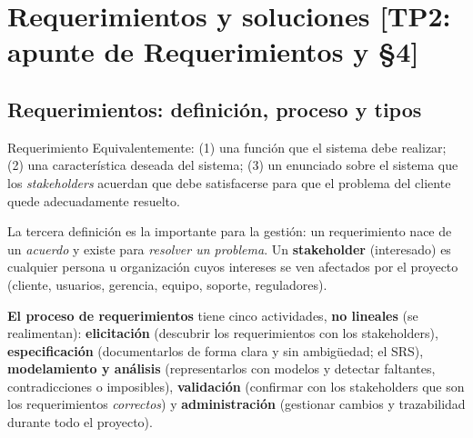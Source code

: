 \documentclass[11pt,a4paper]{article}
\begin{document}
\section[Requerimientos y soluciones]{Requerimientos y soluciones \hfill {\normalsize [TP2: apunte de Requerimientos y §4]}}
\label{sec:req}
\subsection{Requerimientos: definición, proceso y tipos}
\begin{defbox}{Requerimiento}
Equivalentemente: (1) una función que el sistema debe realizar; (2) una característica deseada del sistema;
(3) un enunciado sobre el sistema que los \emph{stakeholders} acuerdan que debe satisfacerse para que el
problema del cliente quede adecuadamente resuelto.
\end{defbox}
La tercera definición es la importante para la gestión: un requerimiento nace de un \emph{acuerdo} y existe
para \emph{resolver un problema}. Un \textbf{stakeholder} (interesado) es cualquier persona u organización cuyos
intereses se ven afectados por el proyecto (cliente, usuarios, gerencia, equipo, soporte, reguladores).

\textbf{El proceso de requerimientos} tiene cinco actividades, \textbf{no lineales} (se realimentan):
\textbf{elicitación} (descubrir los requerimientos con los stakeholders), \textbf{especificación}
(documentarlos de forma clara y sin ambigüedad; el SRS), \textbf{modelamiento y análisis} (representarlos con
modelos y detectar faltantes, contradicciones o imposibles), \textbf{validación} (confirmar con los
stakeholders que son los requerimientos \emph{correctos}) y \textbf{administración} (gestionar cambios y
trazabilidad durante todo el proyecto).
\end{document}
